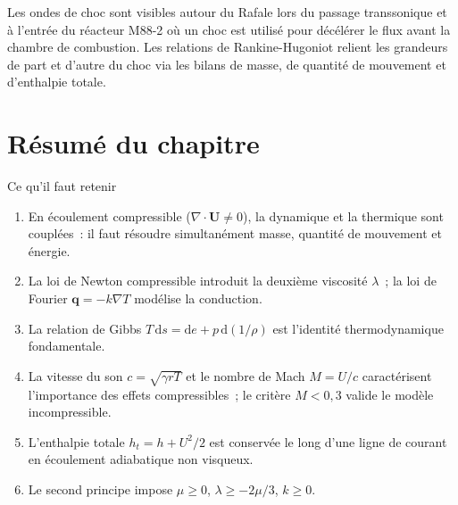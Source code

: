 \documentclass[11pt,a4paper]{report}
\begin{document}
Les ondes de choc sont visibles autour du Rafale lors du passage transsonique et \`a
l'entr\'ee du r\'eacteur M88-2 o\`u un choc est utilis\'e pour d\'ec\'el\'erer le flux
avant la chambre de combustion. Les relations de Rankine-Hugoniot relient les grandeurs
de part et d'autre du choc via les bilans de masse, de quantit\'e de mouvement et
d'enthalpie totale.

\section*{R\'esum\'e du chapitre}

\begin{importantbox}{Ce qu'il faut retenir}
\begin{enumerate}
  \item En \'ecoulement compressible ($\nabla\cdot\bm{U}\neq 0$), la dynamique
        et la thermique sont coupl\'ees~: il faut r\'esoudre simultan\'ement masse,
        quantit\'e de mouvement et \'energie.
  \item La loi de Newton compressible introduit la deuxi\`eme viscosit\'e $\lambda$~;
        la loi de Fourier $\bm{q}=-k\nabla T$ mod\'elise la conduction.
  \item La relation de Gibbs $T\,\mathrm{d}s = \mathrm{d}e + p\,\mathrm{d}(1/\rho)$
        est l'identit\'e thermodynamique fondamentale.
  \item La vitesse du son $c = \sqrt{\gamma r T}$ et le nombre de Mach $M = U/c$
        caract\'erisent l'importance des effets compressibles~; le crit\`ere $M < 0{,}3$
        valide le mod\`ele incompressible.
  \item L'enthalpie totale $h_t = h + U^2/2$ est conserv\'ee le long d'une ligne de
        courant en \'ecoulement adiabatique non visqueux.
  \item Le second principe impose $\mu \geq 0$, $\lambda \geq -2\mu/3$, $k \geq 0$.
\end{enumerate}
\end{importantbox}
\end{document}
